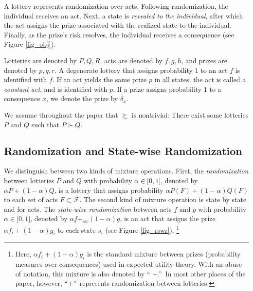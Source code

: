 \documentclass[12pt, notitlepage]{article}
\begin{document}
A lottery represents randomization over acts. Following randomization, the
individual receives an act. Next, a state is \textit{revealed to the
individual}, after which the act assigns the prize associated with the
realized state to the individual. Finally, as the prize's risk resolves, the
individual receives a consequence (see Figure \ref{fig_obj}).

Lotteries are denoted by $P,Q,R$, acts are denoted by $f,g,h$, and prizes
are denoted by $p,q,r$. A degenerate lottery that assigns probability $1$ to
an act $f$ is identified with $f$. If an act yields the same prize $p$ in
all states, the act is called a \textit{constant act}, and is identified
with $p$. If a prize assigns probability $1$ to a consequence $x$, we denote
the prize by $\delta _{x}$.

We assume throughout the paper that $\succsim $ is nontrivial: There exist
some lotteries $P$ and $Q$ such that $P\succ Q$.

\subsection{Randomization and State-wise Randomization}

\label{rswr}We distinguish between two kinds of mixture operations. First,
the \textit{randomization} between lotteries $P$ and $Q$ with probability $%
\alpha \in \lbrack 0,1]$, denoted by $\alpha P+(1-\alpha )Q$, is a lottery
that assigns probability $\alpha P(F)+(1-\alpha )Q(F)$ to each set of acts $%
F\subset \mathcal{F}$. The second kind of mixture operation is state by
state and for acts. The \textit{state-wise randomization} between acts $f$
and $g$ with probability $\alpha \in \lbrack 0,1]$, denoted by $\alpha
f+_{sw}(1-\alpha )g$, is an act that assigns the prize $\alpha
f_{i}+(1-\alpha )g_{i}$ to each state $s_{i}$ (see Figure \ref{fig_rswr}).%
\footnote{%
Here, $\alpha f_{i}+(1-\alpha )g_{i}$ is the standard mixture between prizes
(probability measures over consequences) used in expected utility theory.
With an abuse of notation, this mixture is also denoted by \textquotedblleft 
$+$.\textquotedblright\ In most other places of the paper, however,
\textquotedblleft $+$\textquotedblright\ represents randomization between
lotteries.}

\end{document}
